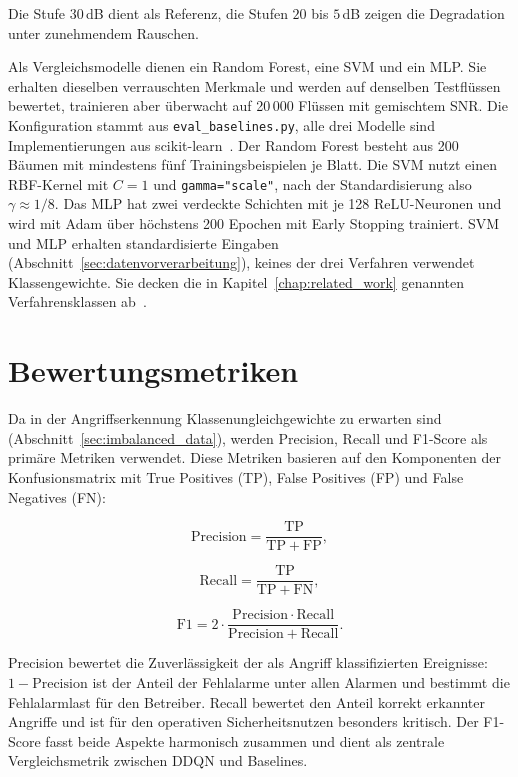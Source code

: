 Die Stufe $30$\,dB dient als Referenz, die Stufen $20$ bis $5$\,dB zeigen die Degradation unter zunehmendem Rauschen.

Als Vergleichsmodelle dienen ein Random Forest, eine SVM und ein MLP. Sie erhalten dieselben verrauschten Merkmale und werden auf denselben Testflüssen bewertet, trainieren aber überwacht auf 20\,000 Flüssen mit gemischtem SNR. Die Konfiguration stammt aus \texttt{eval\_baselines.py}, alle drei Modelle sind Implementierungen aus scikit-learn~\autocite{pedregosaScikitlearnMachineLearning2011}. Der Random Forest besteht aus 200 Bäumen mit mindestens fünf Trainingsbeispielen je Blatt. Die SVM nutzt einen RBF-Kernel mit $C=1$ und \texttt{gamma=\string"scale\string"}, nach der Standardisierung also $\gamma\approx1/8$. Das MLP hat zwei verdeckte Schichten mit je 128 ReLU-Neuronen und wird mit Adam über höchstens 200 Epochen mit Early Stopping trainiert. SVM und MLP erhalten standardisierte Eingaben (Abschnitt~\ref{sec:datenvorverarbeitung}), keines der drei Verfahren verwendet Klassengewichte. Sie decken die in Kapitel~\ref{chap:related_work} genannten Verfahrensklassen ab~\autocite{koComparativeStudyAIEnabled2023, razaFeatureSelectionBasedDDoSAttack2024}.

\section{Bewertungsmetriken}
\label{sec:eval_metriken}

Da in der Angriffserkennung Klassenungleichgewichte zu erwarten sind (Abschnitt~\ref{sec:imbalanced_data}), werden Precision, Recall und F1-Score als primäre Metriken verwendet. Diese Metriken basieren auf den Komponenten der Konfusionsmatrix mit True Positives (TP), False Positives (FP) und False Negatives (FN):

\begin{equation}
\mathrm{Precision} = \frac{\mathrm{TP}}{\mathrm{TP}+\mathrm{FP}},
\end{equation}

\begin{equation}
\mathrm{Recall} = \frac{\mathrm{TP}}{\mathrm{TP}+\mathrm{FN}},
\end{equation}

\begin{equation}
\mathrm{F1} = 2 \cdot \frac{\mathrm{Precision} \cdot \mathrm{Recall}}{\mathrm{Precision} + \mathrm{Recall}}.
\end{equation}

Precision bewertet die Zuverlässigkeit der als Angriff klassifizierten Ereignisse: \mbox{$1-\mathrm{Precision}$} ist der Anteil der Fehlalarme unter allen Alarmen und bestimmt die Fehlalarmlast für den Betreiber. Recall bewertet den Anteil korrekt erkannter Angriffe und ist für den operativen Sicherheitsnutzen besonders kritisch. Der F1-Score fasst beide Aspekte harmonisch zusammen und dient als zentrale Vergleichsmetrik zwischen DDQN und Baselines.

